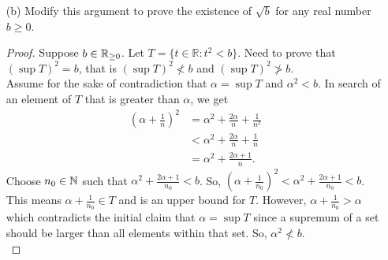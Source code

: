 \documentclass[12pt,letterpaper]{article}
\begin{document}
\begin{itemize}[leftmargin=!,labelindent=5pt]
\begin{itemize}
\begin{proof}
                        This means $\alpha - \frac{1}{n_0}$ must be an upper bound for $T$. 
                        However, $\alpha - \frac{1}{n_0} < \alpha$ which contradicts the initial claim that $\alpha = \sup T$. 
                        So, $\alpha^2 \not > 2$. 
                        Since, part 1 of the proof showed that $\alpha^2 \not < 2$, the only conclusion left is that $\alpha^2 = 2$ which means $\alpha = \sqrt{2} \in \bbR$.
                    \end{proof}
                \newpage
                \item [(b)] Modify this argument to prove the existence of $\sqrt{b}$ for any real number $b \geq 0$.
                    \begin{proof}
                        Suppose $b \in \mathbb{R}_{\geq 0}$.
                        Let $T = \{t \in \mathbb{R} : t^2 < b\}$.
                        Need to prove that $(\sup T)^2 = b$, that is $(\sup T)^2 \not < b$ and $(\sup T)^2 \not > b$. \\

                        Assume for the sake of contradiction that $\alpha = \sup T$ and $\alpha^2 < b$.
                        In search of an element of $T$ that is greater than $\alpha$, we get
                        \begin{align*}
                            (\alpha + \frac{1}{n})^2 &= \alpha^2 + \frac{2\alpha}{n} + \frac{1}{n^2} \\
                            &< \alpha^2 + \frac{2\alpha}{n} + \frac{1}{n} \\
                            &= \alpha^2 + \frac{2\alpha+1}{n}.
                        \end{align*}
                        Choose $n_0 \in \mathbb{N}$ such that $\alpha^2 + \frac{2\alpha + 1}{n_0} < b$.
                        So, $(\alpha + \frac{1}{n_0})^2 < \alpha^2 + \frac{2\alpha + 1}{n_0} < b$.
                        This means $\alpha + \frac{1}{n_0} \in T$ and is an upper bound for $T$.
                        However, $\alpha+\frac{1}{n_0} > \alpha$ which contradicts the initial claim that $\alpha = \sup T$ since a supremum of a set should be larger than all elements within that set.
                        So, $\alpha^2 \not < b$. \\


\end{proof}
\end{itemize}
\end{itemize}
\end{document}
